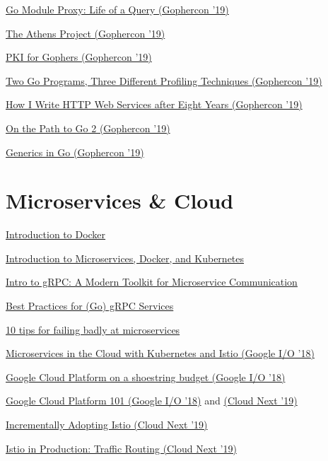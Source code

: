 \documentclass[12pt,notitlepage]{article}
\begin{document}
\href{https://www.youtube.com/watch?v=KqTySYYhPUE}{Go Module Proxy: Life of a Query (Gophercon '19)}

\href{https://www.youtube.com/watch?v=WDbbIS7m9bU}{The Athens Project (Gophercon '19)}

\href{https://www.youtube.com/watch?v=VwPQKS9Njv0}{PKI for Gophers (Gophercon '19)}

\href{https://www.youtube.com/watch?v=nok0aYiGiYA}{Two Go Programs, Three Different Profiling Techniques (Gophercon '19)}

\href{https://www.youtube.com/watch?v=rWBSMsLG8po}{How I Write HTTP Web Services after Eight Years (Gophercon '19)}

\href{https://www.youtube.com/watch?v=kNHo788oO5Y}{On the Path to Go 2 (Gophercon '19)}

\href{https://www.youtube.com/watch?v=WzgLqE-3IhY}{Generics in Go (Gophercon '19)}


\section{Microservices \& Cloud}

\href{https://www.youtube.com/watch?v=Q5POuMHxW-0}{Introduction to Docker}

\href{https://www.youtube.com/watch?v=1xo-0gCVhTU}{Introduction to Microservices, Docker, and Kubernetes}

\href{https://www.youtube.com/watch?v=RoXT_Rkg8LA}{Intro to gRPC: A Modern Toolkit for Microservice Communication}

\href{https://www.youtube.com/watch?v=Z_yD7YPL2oE}{Best Practices for (Go) gRPC Services}

\href{https://www.youtube.com/watch?v=X0tjziAQfNQ}{10 tips for failing badly at microservices}

\href{https://www.youtube.com/watch?v=gauOI0O9fRM}{Microservices in the Cloud with Kubernetes and Istio (Google I/O '18)}

\href{https://www.youtube.com/watch?v=N2OG1w6bGFo}{Google Cloud Platform on a shoestring budget (Google I/O '18)}

\href{https://www.youtube.com/watch?v=trJaoEtBh6w}{Google Cloud Platform 101 (Google I/O '18)} and
\href{https://www.youtube.com/watch?v=vmOMataJZWw}{(Cloud Next '19)}

\href{https://www.youtube.com/watch?v=0cgTHQFXYPQ}{Incrementally Adopting Istio (Cloud Next '19)}

\href{https://www.youtube.com/watch?v=7cINRP0BFY8}{Istio in Production: Traffic Routing (Cloud Next '19)}
\end{document}
